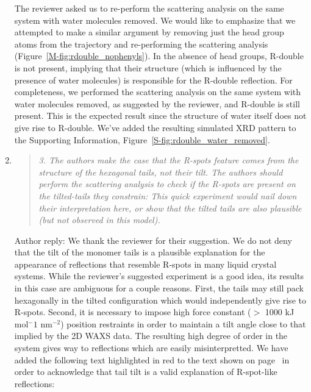 \documentclass{article}
\begin{document}
\begin{enumerate}
    The reviewer asked us to re-perform the scattering analysis on the same
    system with water molecules removed. We would like to emphasize that we
    attempted to make a similar argument by removing just the head group atoms from
    the trajectory and re-performing the scattering analysis
    (Figure~\ref{M-fig:rdouble_nophenyls}). In the absence of head groups, R-double
    is not present, implying that their structure (which is influenced by the
    presence of water molecules) is responsible for the R-double reflection. For
    completeness, we performed the scattering analysis on the same system with
    water molecules removed, as suggested by the reviewer, and R-double is still
    present. This is the expected result since the structure of water itself does
    not give rise to R-double. We've added the resulting simulated XRD pattern to
    the Supporting Information, Figure~\ref{S-fig:rdouble_water_removed}. 
   
    \item \begin{quote}
    \textit{3. The authors make the case that the R-spots feature comes from the 
    structure of the hexagonal tails, not their tilt. The authors should perform the
    scattering analysis to check if the R-spots are present on the tilted-tails they
    constrain: This quick experiment would nail down their interpretation here, or 
    show that the tilted tails are also plausible (but not observed in this model).}
    \end{quote}

    Author reply: We thank the reviewer for their suggestion. We do not deny
    that the tilt of the monomer tails is a plausible explanation for the
    appearance of reflections that resemble R-spots in many liquid crystal systems.
    While the reviewer's suggested experiment is a good idea, its results in this
    case are ambiguous for a couple reasons. First, the tails may still pack
    hexagonally in the tilted configuration which would independently give rise to
    R-spots. Second, it is necessary to impose high force constant ($>$ 1000 kJ mol$^-1$
    nm$^{-2}$) position restraints in order to maintain a tilt angle close to that
    implied by the 2D WAXS data. The resulting high degree of order in the system 
    gives way to reflections which are easily misinterpretted. We have added the
    following text highlighted in red to the text shown on page~\pageref{M-addition:rspots} in order to
    acknowledge that tail tilt is a valid explanation of R-spot-like reflections: 
 

\end{enumerate}
\end{document}
